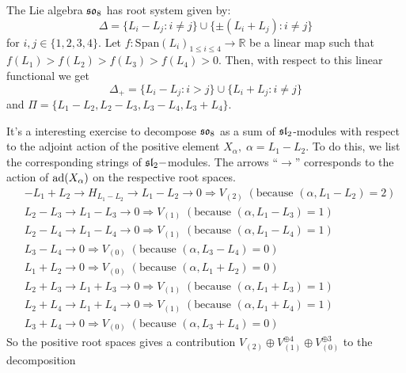 \begin{dang}
    \begin{example}
        The Lie algebra $\mathfrak{so}_8$ has root system given by:
        \begin{equation}
            \Delta=\{L_i-L_j:i\neq j\}\cup\{\pm(L_i+L_j):i\neq j\}
        \end{equation}
        for $i,j\in\{1,2,3,4\}$. Let $f:\text{Span}(L_i)_{1\leq i\leq4}\to\mathbb{R}$ be a linear map such that 
        $f(L_1)>f(L_2)>f(L_3)>f(L_4)>0$. Then, with respect to this linear functional we get 
        \begin{equation}
            \Delta_+=\{L_i-L_j:i>j\}\cup\{L_i+L_j:i\neq j\}
        \end{equation}
        and $\Pi=\{L_1-L_2,L_2-L_3,L_3-L_4,L_3+L_4\}$. 
    \end{example}
\end{dang}
It's a interesting exercise to decompose $\mathfrak{so}_8$ as a sum of $\mathfrak{sl}_2$-modules with respect to the adjoint action 
of the positive element $X_{\alpha},\;\alpha=L_1-L_2$. To do this, we list the corresponding strings of $\mathfrak{sl}_2-$modules.
The arrows ``$\to$'' corresponds to the action of $\text{ad}(X_{\alpha})$ on the respective root spaces.
\begin{equation}
    \begin{split}
        &-L_1+L_2\to H_{L_1-L_2}\to L_1-L_2 \to 0 \Rightarrow V_{(2)}\;(\text{because }(\alpha,L_1-L_2)=2)\\
        &L_2-L_3 \to  L_1-L_3\to0\Rightarrow V_{(1)}\;(\text{because }(\alpha,L_1-L_3)=1)\\
        &L_2-L_4\to L_1-L_4\to 0\Rightarrow V_{(1)}\;(\text{because }(\alpha,L_1-L_4)=1)\\
        &L_3-L_4\to 0\Rightarrow V_{(0)}\;(\text{because }(\alpha,L_3-L_4)=0)\\
        &L_1+L_2\to 0\Rightarrow V_{(0)}\;(\text{because }(\alpha,L_1+L_2)=0)\\
        &L_2+L_3\to L_1+L_3\to0\Rightarrow V_{(1)}\;(\text{because }(\alpha,L_1+L_3)=1)\\
        &L_2+L_4\to L_1+L_4\to0\Rightarrow V_{(1)}\;(\text{because }(\alpha,L_1+L_4)=1)\\
        &L_3+L_4\to0\Rightarrow V_{(0)}\;(\text{because }(\alpha,L_3+L_4)=0)
    \end{split}
\end{equation}
So the positive root spaces gives a contribution 
$V_{(2)}\oplus V_{(1)}^{\oplus 4}\oplus V_{(0)}^{\oplus 3}$ to the decomposition
